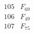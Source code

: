 \documentclass{article}
\begin{document}
{$$\begin{array}{|r|*{7}{r|}}
 & 
 & 
\\
\hline
105 
 & F_{69} &
 & 
 & 
 & 
 & 
 & 
\\
\hline
106 
 & F_{49} &
 & 
 & 
 & 
 & 
 & 
\\
\hline
107 
 & F_{75} &
 & 

\end{array}$$}
\end{document}
